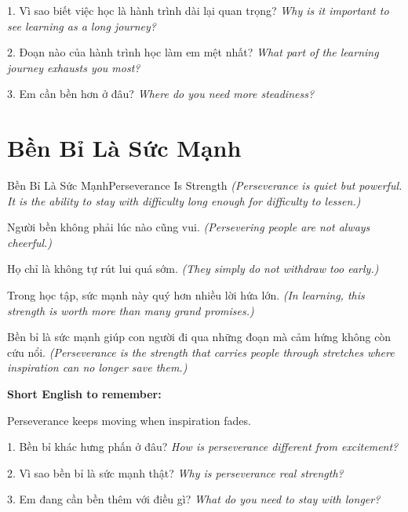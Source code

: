 \begin{tuhocnhanh}
1. Vì sao biết việc học là hành trình dài lại quan trọng? \textit{Why is it important to see learning as a long journey?}

2. Đoạn nào của hành trình học làm em mệt nhất? \textit{What part of the learning journey exhausts you most?}

3. Em cần bền hơn ở đâu? \textit{Where do you need more steadiness?}
\end{tuhocnhanh}
\ngancach

\section{Bền Bỉ Là Sức Mạnh}
\begin{truyen}{Bền Bỉ Là Sức Mạnh}{Perseverance Is Strength}
\textit{(Perseverance is quiet but powerful. It is the ability to stay with difficulty long enough for difficulty to lessen.)}

Người bền không phải lúc nào cũng vui.
\textit{(Persevering people are not always cheerful.)}

Họ chỉ là không tự rút lui quá sớm.
\textit{(They simply do not withdraw too early.)}

Trong học tập, sức mạnh này quý hơn nhiều lời hứa lớn.
\textit{(In learning, this strength is worth more than many grand promises.)}
\end{truyen}

\begin{baihoc}
Bền bỉ là sức mạnh giúp con người đi qua những đoạn mà cảm hứng không còn cứu nổi.
\textit{(Perseverance is the strength that carries people through stretches where inspiration can no longer save them.)}
\end{baihoc}

\begin{ghinhoanh}
\textbf{Short English to remember:}

Perseverance keeps moving when inspiration fades.

\end{ghinhoanh}

\begin{tuhocnhanh}
1. Bền bỉ khác hưng phấn ở đâu? \textit{How is perseverance different from excitement?}

2. Vì sao bền bỉ là sức mạnh thật? \textit{Why is perseverance real strength?}

3. Em đang cần bền thêm với điều gì? \textit{What do you need to stay with longer?}
\end{tuhocnhanh}
\ngancach

